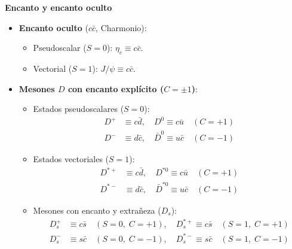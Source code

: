 \textbf{Encanto y encanto oculto}
\begin{itemize}
    \item \textbf{Encanto oculto} ($c\bar{c}$, Charmonio):
    \begin{itemize}
        \item Pseudoscalar ($S = 0$): $\eta_c \equiv c\bar{c}$.
        \item Vectorial ($S = 1$): $J/\psi \equiv c\bar{c}$.
    \end{itemize}
    \item \textbf{Mesones $D$ con encanto explícito ($C = \pm 1$)}:
    \begin{itemize}
        \item Estados pseudoscalares ($S = 0$):
        \begin{align}
            D^+ &\equiv c\bar{d}, \quad D^0 \equiv c\bar{u} \quad (C = +1) \\
            D^- &\equiv d\bar{c}, \quad \bar{D}^0 \equiv u\bar{c} \quad (C = -1)
        \end{align}
        \item Estados vectoriales ($S = 1$):
        \begin{align}
            D^{*+} &\equiv c\bar{d}, \quad D^{*0} \equiv c\bar{u} \quad (C = +1) \\
            D^{*-} &\equiv d\bar{c}, \quad \bar{D}^{*0} \equiv u\bar{c} \quad (C = -1)
        \end{align}
        \item Mesones con encanto y extrañeza ($D_s$):
        \begin{align}
            D_s^+ &\equiv c\bar{s} \quad (S=0, \; C=+1), \quad D_s^{*+} \equiv c\bar{s} \quad (S=1, \; C=+1) \\
            D_s^- &\equiv s\bar{c} \quad (S=0, \; C=-1), \quad D_s^{*-} \equiv s\bar{c} \quad (S=1, \; C=-1)
        \end{align}
    \end{itemize}
\end{itemize}

